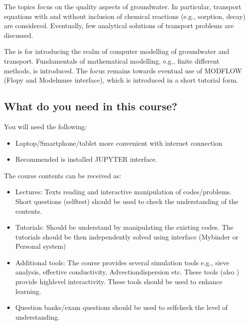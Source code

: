 \documentclass[letterpaper,10pt,english]{sphinxmanual}
\begin{document}
The  topics focus on the quality aspects of groundwater. In particular, transport equations with and without inclusion of chemical reactions (e.g., sorption, decay) are considered. Eventually, few analytical solutions of transport problems are discussed.

The  is for introducing the realm of computer modelling of groundwater and transport. Fundamentals of mathematical modelling, e.g., finite different methods, is introduced. The focus remains towards eventual use of MODFLOW (Flopy and Modelmuse interface), which is introduced in a short tutorial form.


\subsection{What do you need in this course?}
\label{\detokenize{contents/background/00_general:what-do-you-need-in-this-course}}
You will need the following:
\begin{itemize}
\item {} 
Laptop/Smartphone/tablet more convenient with internet connection

\item {} 
Recommended is installed JUPYTER interface.

\end{itemize}

The course contents can be received as:
\begin{itemize}
\item {} 
Lectures: Texts reading and interactive manipulation of codes/problems. Short questions (self\sphinxhyphen{}test) should be used to check the understanding of the contents.

\item {} 
Tutorials: Should be understand by manipulating the existing codes. The tutorials should be then independently solved using  interface (Mybinder or Personal system)

\item {} 
Additional tools: The course provides several simulation tools\sphinxhyphen{} e.g., sieve analysis, effective conductivity, Advection\sphinxhyphen{}dispersion etc. These tools (also ) provide high\sphinxhyphen{}level interactivity. These tools should be used to enhance learning.

\item {} 
Question banks/exam questions should be used to self\sphinxhyphen{}check the level of understanding.

\end{itemize}
\end{document}
